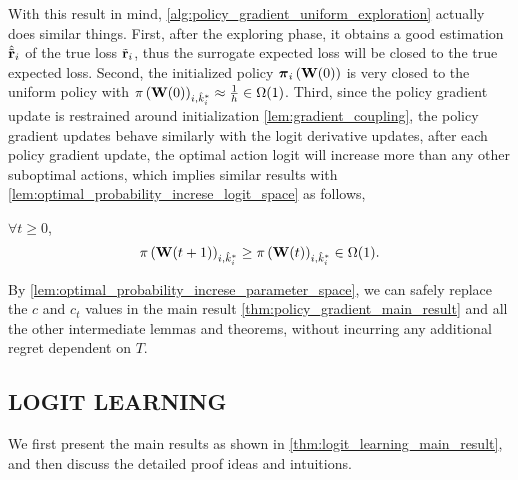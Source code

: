 With this result in mind, \cref{alg:policy_gradient_uniform_exploration} actually does similar things. First, after the exploring phase, it obtains a good estimation $\hat{{\tilde{\mathbf{r}}}}_i$ of the true loss ${\tilde{\mathbf{r}}}_i$, thus the surrogate expected loss will be closed to the true expected loss. Second, the initialized policy ${\boldsymbol{\pi}}_i\left( {\mathbf{W}}(0) \right)$ is very closed to the uniform policy with $\pi\left( {\mathbf{W}}(0)\right)_{i, \hat{k}_i^*} \approx \frac{1}{h} \in \Omega(1)$. Third, since the policy gradient update is restrained around initialization \cref{lem:gradient_coupling}, the policy gradient updates behave similarly with the logit derivative updates, after each policy gradient update, the optimal action logit will increase more than any other  suboptimal actions, which implies similar results with \cref{lem:optimal_probability_increse_logit_space} as follows,
\begin{lem}
\label{lem:optimal_probability_increse_parameter_space}
$\forall t \ge 0$,
\begin{equation*}
    \pi\left( {\mathbf{W}}(t+1)\right)_{i,\hat{k}_i^*} \ge \pi\left( {\mathbf{W}}(t)\right)_{i,\hat{k}_i^*} \in \Omega(1).
\end{equation*}
\end{lem}
By \cref{lem:optimal_probability_increse_parameter_space}, we can safely replace the $c$ and $c_t$ values in the main result \cref{thm:policy_gradient_main_result} and all the other intermediate lemmas and theorems, without incurring any additional regret dependent on $T$.

\subsection{LOGIT LEARNING}
\label{subsec:theoretical_analyses_logit_learning}

We first present the main results as shown in \cref{thm:logit_learning_main_result}, and then discuss the detailed proof ideas and intuitions.

